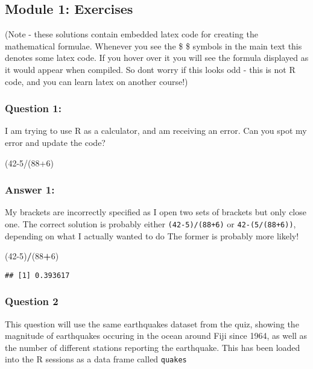 \documentclass[
]{article}
\author{}
\date{\vspace{-2.5em}}
\newenvironment{Shaded}{\begin{snugshade}}{\end{snugshade}}
\newcommand{\DecValTok}[1]{\textcolor[rgb]{0.00,0.00,0.81}{#1}}
\newcommand{\NormalTok}[1]{#1}
\newcommand{\OperatorTok}[1]{\textcolor[rgb]{0.81,0.36,0.00}{\textbf{#1}}}
\begin{document}
\hypertarget{module-1-exercises}{%
\subsection{Module 1: Exercises}\label{module-1-exercises}}

(Note - these solutions contain embedded latex code for creating the
mathematical formulae. Whenever you see the \$ \$ symbols in the main
text this denotes some latex code. If you hover over it you will see the
formula displayed as it would appear when compiled. So dont worry if
this looks odd - this is not R code, and you can learn latex on another
course!)

\hypertarget{question-1}{%
\subsubsection{Question 1:}\label{question-1}}

I am trying to use R as a calculator, and am receiving an error. Can you
spot my error and update the code?

(42-5/(88+6)

\hypertarget{answer-1}{%
\subsubsection{Answer 1:}\label{answer-1}}

My brackets are incorrectly specified as I open two sets of brackets but
only close one. The correct solution is probably either
\texttt{(42-5)/(88+6)} or \texttt{42-(5/(88+6))}, depending on what I
actually wanted to do The former is probably more likely!

\begin{Shaded}
\begin{Highlighting}[]
\NormalTok{(}\DecValTok{42-5}\NormalTok{)}\OperatorTok{/}\NormalTok{(}\DecValTok{88}\OperatorTok{+}\DecValTok{6}\NormalTok{)}
\end{Highlighting}
\end{Shaded}

\begin{verbatim}
## [1] 0.393617
\end{verbatim}

\hypertarget{question-2}{%
\subsubsection{Question 2}\label{question-2}}

This question will use the same earthquakes dataset from the quiz,
showing the magnitude of earthquakes occuring in the ocean around Fiji
since 1964, as well as the number of different stations reporting the
earthquake. This has been loaded into the R sessions as a data frame
called \texttt{quakes}
\end{document}
